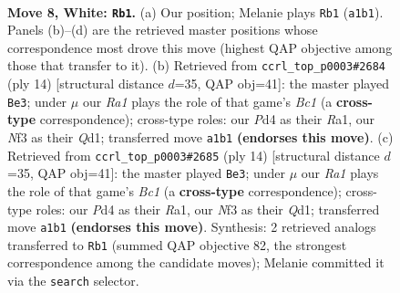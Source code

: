 \documentclass[11pt]{article}
\begin{document}
\begin{figure}[p]\centering
\begin{subfigure}{0.46\textwidth}\centering
\resizebox{\linewidth}{!}{%
\newchessgame
\chessboard[
  setfen={rnbqk1r1/pp2bppp/4pn2/2Pp4/3P4/2N2N2/PP3PPP/R1BQKB1R w KQq - 1 8},
  showmover=false,
  pgfstyle=straightmove, color=movearrow, markmove={a1-b1}
]}
\caption{}
\end{subfigure}\hfill
\begin{subfigure}{0.46\textwidth}\centering
\resizebox{\linewidth}{!}{%
\newchessgame
\chessboard[
  setfen={rnbqk2r/1p2bppp/p2ppn2/8/2PNP3/2N2P2/PP4PP/R1BQKB1R w KQkq - 2 8},
  showmover=false,
  pgfstyle=straightmove, color=movearrow, markmove={c1-e3}
]}
\caption{}
\end{subfigure}
\\[4pt]
\begin{subfigure}{0.46\textwidth}\centering
\resizebox{\linewidth}{!}{%
\newchessgame
\chessboard[
  setfen={rnbqk2r/1p2bppp/p2ppn2/8/2PNP3/2N2P2/PP4PP/R1BQKB1R w KQkq - 2 8},
  showmover=false,
  pgfstyle=straightmove, color=movearrow, markmove={c1-e3}
]}
\caption{}
\end{subfigure}\hfill

\caption{\textbf{Move 8, White: \texttt{Rb1}.} (a) Our position; Melanie plays \texttt{Rb1} (\texttt{a1b1}). Panels (b)--(d) are the retrieved master positions whose correspondence most drove this move (highest QAP objective among those that transfer to it). (b) Retrieved from \texttt{ccrl\_top\_p0003\#2684} (ply 14) [structural distance $d$=35, QAP obj=41]: the master played \texttt{Be3}; under $\mu$ our \emph{Ra1} plays the role of that game's \emph{Bc1} (a \textbf{cross-type} correspondence); cross-type roles: our \emph{P}d4 as their \emph{R}a1, our \emph{N}f3 as their \emph{Q}d1; transferred move \texttt{a1b1} \textbf{(endorses this move)}. (c) Retrieved from \texttt{ccrl\_top\_p0003\#2685} (ply 14) [structural distance $d$=35, QAP obj=41]: the master played \texttt{Be3}; under $\mu$ our \emph{Ra1} plays the role of that game's \emph{Bc1} (a \textbf{cross-type} correspondence); cross-type roles: our \emph{P}d4 as their \emph{R}a1, our \emph{N}f3 as their \emph{Q}d1; transferred move \texttt{a1b1} \textbf{(endorses this move)}. Synthesis: 2 retrieved analogs transferred to \texttt{Rb1} (summed QAP objective 82, the strongest correspondence among the candidate moves); Melanie committed it via the \texttt{search} selector.}
\label{fig:thought-m14}
\end{figure}
\end{document}
